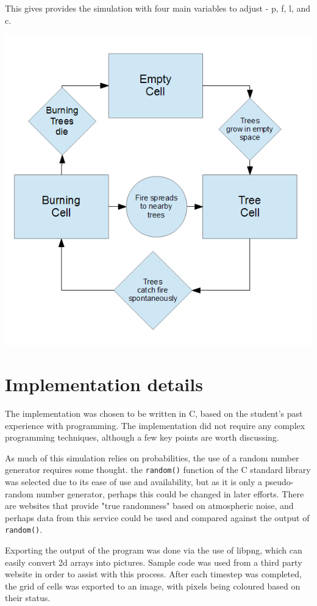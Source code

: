 \documentclass[11pt,a4paper]{article}
\begin{document}
This gives provides the simulation with four main variables to adjust - p, f,
l, and c.

\includegraphics{tex/flowchart}

\newpage
\section{Implementation details}

The implementation was chosen to be written in C, based on the student's past
experience with programming. The implementation did not require any complex
programming techniques, although a few key points are worth discussing.

As much of this simulation relies on probabilities, the use of a random number
generator requires some thought. the \texttt{random()} function of the C
standard library was selected due to its ease of use and availability, but as
it is only a pseudo-random number generator, perhaps this could be changed in
later efforts. There are websites that provide "true randomness" based on
atmospheric noise\cite{random}, and perhaps data from this service could be
used and compared against the output of \texttt{random()}.

Exporting the output of the program was done via the use of
libpng\cite{libpng}, which can easily convert 2d arrays into pictures. Sample
code was used from a third party website in order to assist with this
process\cite{png}. After each timestep was completed, the grid of cells was
exported to an image, with pixels being coloured based on their status.
\end{document}

